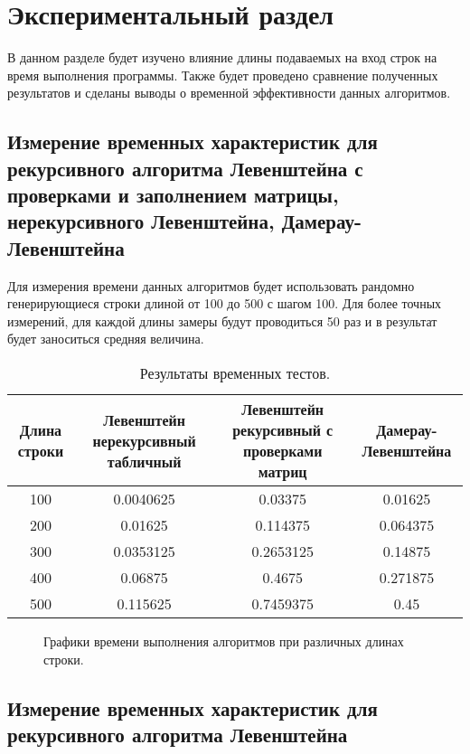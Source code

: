 \chapter{Экспериментальный раздел}

В данном разделе будет изучено влияние длины подаваемых на вход строк на время выполнения программы. Также будет проведено сравнение полученных результатов и сделаны выводы о временной эффективности данных алгоритмов.

\section{Измерение временных характеристик для рекурсивного алгоритма Левенштейна с проверками и заполнением матрицы, нерекурсивного Левенштейна, Дамерау-Левенштейна}

Для измерения времени данных алгоритмов будет использовать рандомно генерирующиеся строки длиной от 100 до 500 с шагом 100. Для более точных измерений, для каждой длины замеры будут проводиться 50 раз и в результат будет заноситься средняя величина.

\begin{table}[h!]
  \begin{center}
 \captionsetup{justification=raggedright}
    \caption{Результаты временных тестов.}
    \label{tab:table4}
    \begin{tabular}{c|c|c|c}
	\textbf{Длина строки} & \textbf{Левенштейн нерекурсивный табличный} & \textbf{Левенштейн рекурсивный с проверками матриц} & \textbf{Дамерау-Левенштейна}\\
      \hline
	100 & 0.0040625 & 0.03375 & 0.01625\\
	200 & 0.01625 & 0.114375 & 0.064375\\
	300 & 0.0353125 & 0.2653125 & 0.14875\\
	400 & 0.06875 & 0.4675 & 0.271875\\
	500 & 0.115625 & 0.7459375 & 0.45\\
    \end{tabular}
  \end{center}
\end{table}

\begin{figure}[ph!]
	\caption{Графики времени выполнения алгоритмов при различных длинах строки.}
\end{figure}


\section{Измерение временных характеристик для рекурсивного алгоритма Левенштейна}

